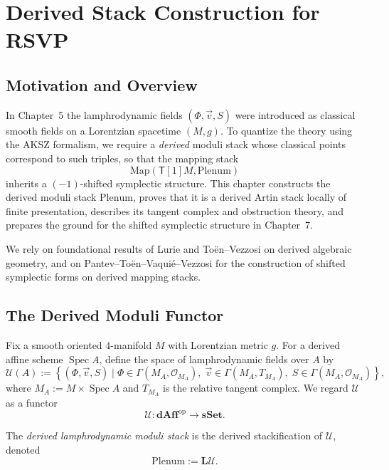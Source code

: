 \chapter{Derived Stack Construction for RSVP}

\section{Motivation and Overview}

In Chapter~5 the lamphrodynamic fields $(\Phi,\vec v,S)$ were introduced
as classical smooth fields on a Lorentzian spacetime $(M,g)$.
To quantize the theory using the AKSZ formalism,
we require a \emph{derived} moduli stack whose classical points correspond
to such triples, so that the mapping stack
\[
\mathrm{Map}(\mathsf{T}[1]M,\mathrm{Plenum})
\]
inherits a $(-1)$-shifted symplectic structure.
This chapter constructs the derived moduli stack $\mathrm{Plenum}$,
proves that it is a derived Artin stack locally of finite presentation,
describes its tangent complex and obstruction theory,
and prepares the ground for the shifted symplectic structure in
Chapter~7.

We rely on foundational results of Lurie \cite{Lurie-DAG} and
To\"en--Vezzosi \cite{ToenVezzosi-HAGII} on derived algebraic geometry,
and on Pantev--To\"en--Vaqui\'e--Vezzosi \cite{PTVV13} for the
construction of shifted symplectic forms on derived mapping stacks.


\section{The Derived Moduli Functor}

Fix a smooth oriented $4$-manifold $M$ with Lorentzian metric $g$.
For a derived affine scheme $\operatorname{Spec}A$,
define the space of lamphrodynamic fields over $A$ by
\[
\mathcal{U}(A)
:= \left\{
(\Phi,\vec v,S) \mid 
\Phi\in\Gamma(M_A,\mathcal{O}_{M_A}),
\;
\vec v\in\Gamma(M_A,T_{M_A}),
\;
S\in\Gamma(M_A,\mathcal{O}_{M_A})
\right\},
\]
where $M_A := M\times\operatorname{Spec}A$ and
$T_{M_A}$ is the relative tangent complex.
We regard $\mathcal{U}$ as a functor
\[
\mathcal{U} \colon \mathbf{dAff}^{\mathrm{op}}
\longrightarrow \mathbf{sSet}.
\]

\begin{definition}
The \emph{derived lamphrodynamic moduli stack} is the derived
stackification of $\mathcal{U}$, denoted
\[
\mathrm{Plenum} := \mathbf{L}\mathcal{U}.
\]
\end{definition}

